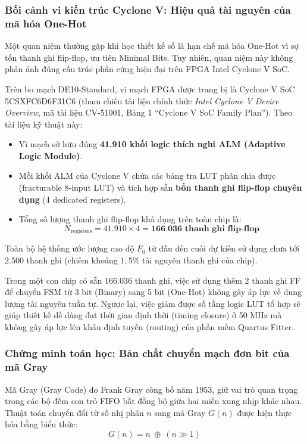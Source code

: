 \subsubsection*{Bối cảnh vi kiến trúc Cyclone V: Hiệu quả tài nguyên của mã hóa One-Hot}
Một quan niệm thường gặp khi học thiết kế số là hạn chế mã hóa One-Hot vì sợ tốn thanh ghi flip-flop, ưu tiên Minimal Bits. Tuy nhiên, quan niệm này không phản ánh đúng cấu trúc phần cứng hiện đại trên FPGA Intel Cyclone V SoC.

Trên bo mạch DE10-Standard, vi mạch FPGA được trang bị là Cyclone V SoC 5CSXFC6D6F31C6 (tham chiếu tài liệu chính thức \emph{Intel Cyclone V Device Overview}, mã tài liệu CV-51001, Bảng 1 ``Cyclone V SoC Family Plan''). Theo tài liệu kỹ thuật này:
\begin{itemize}[leftmargin=1.5em, itemsep=2pt]
    \item Vi mạch sở hữu đúng \textbf{41.910 khối logic thích nghi ALM (Adaptive Logic Module)}.
    \item Mỗi khối ALM của Cyclone V chứa các bảng tra LUT phân chia được (fracturable 8-input LUT) và tích hợp sẵn \textbf{bốn thanh ghi flip-flop chuyên dụng} (4 dedicated registers).
    \item Tổng số lượng thanh ghi flip-flop khả dụng trên toàn chip là:
    \begin{equation}
    N_{\text{registers}} = 41.910 \times 4 = \textbf{166.036 thanh ghi flip-flop}
    \end{equation}
\end{itemize}

Toàn bộ hệ thống ước lượng cao độ $F_0$ từ đầu đến cuối dự kiến sử dụng chưa tới $2.500$ thanh ghi (chiếm khoảng $1{,}5\%$ tài nguyên thanh ghi của chip). 

Trong một con chip có sẵn $166.036$ thanh ghi, việc sử dụng thêm 2 thanh ghi FF để chuyển FSM từ 3 bit (Binary) sang 5 bit (One-Hot) không gây áp lực về dung lượng tài nguyên tuần tự. Ngược lại, việc giảm được số tầng logic LUT tổ hợp sẽ giúp thiết kế dễ dàng đạt thời gian định thời (timing closure) ở 50 MHz mà không gây áp lực lên khâu định tuyến (routing) của phần mềm Quartus Fitter.

\subsubsection*{Chứng minh toán học: Bản chất chuyển mạch đơn bit của mã Gray}
Mã Gray (Gray Code) do Frank Gray công bố năm 1953, giữ vai trò quan trọng trong các bộ đếm con trỏ FIFO bất đồng bộ giữa hai miền xung nhịp khác nhau. Thuật toán chuyển đổi từ số nhị phân $n$ sang mã Gray $G(n)$ được hiện thực hóa bằng biểu thức:
\begin{equation}
G(n) = n \ \oplus \ (n \gg 1)
\end{equation}


